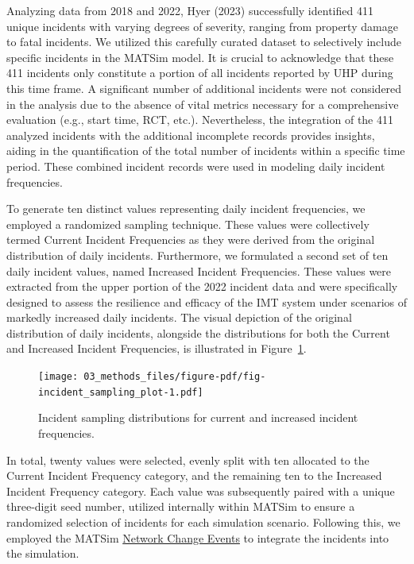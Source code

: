 \documentclass[fancy, oneside, mastersfancy, ms]{byuthesis}
\begin{document}
Analyzing data from 2018 and 2022, Hyer (2023) successfully identified
411 unique incidents with varying degrees of severity, ranging from
property damage to fatal incidents. We utilized this carefully curated
dataset to selectively include specific incidents in the MATSim model.
It is crucial to acknowledge that these 411 incidents only constitute a
portion of all incidents reported by UHP during this time frame. A
significant number of additional incidents were not considered in the
analysis due to the absence of vital metrics necessary for a
comprehensive evaluation (e.g., start time, RCT, etc.). Nevertheless,
the integration of the 411 analyzed incidents with the additional
incomplete records provides insights, aiding in the quantification of
the total number of incidents within a specific time period. These
combined incident records were used in modeling daily incident
frequencies.

To generate ten distinct values representing daily incident frequencies,
we employed a randomized sampling technique. These values were
collectively termed Current Incident Frequencies as they were derived
from the original distribution of daily incidents. Furthermore, we
formulated a second set of ten daily incident values, named Increased
Incident Frequencies. These values were extracted from the upper portion
of the 2022 incident data and were specifically designed to assess the
resilience and efficacy of the IMT system under scenarios of markedly
increased daily incidents. The visual depiction of the original
distribution of daily incidents, alongside the distributions for both
the Current and Increased Incident Frequencies, is illustrated in
Figure~\ref{fig-incident_sampling_plot}.

\begin{figure}

{\centering \texttt{[image: 03\_methods\_files/figure-pdf/fig-incident\_sampling\_plot-1.pdf]}

}

\caption{\label{fig-incident_sampling_plot}Incident sampling
distributions for current and increased incident frequencies.}

\end{figure}

In total, twenty values were selected, evenly split with ten allocated
to the Current Incident Frequency category, and the remaining ten to the
Increased Incident Frequency category. Each value was subsequently
paired with a unique three-digit seed number, utilized internally within
MATSim to ensure a randomized selection of incidents for each simulation
scenario. Following this, we employed the MATSim
\protect\hyperlink{sec-NCE}{Network Change Events} to integrate the
incidents into the simulation.
\end{document}
